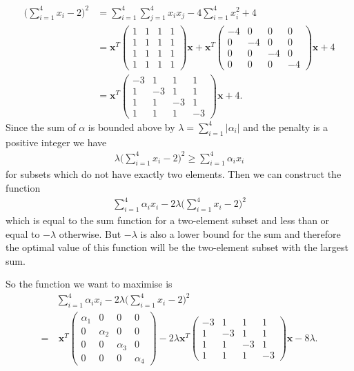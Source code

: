 \documentclass{article}
\begin{document}
\begin{align*}
	\bigg(\sum_{i=1}^4 x_i - 2\bigg)^2 &= \sum_{i=1}^4\sum_{j=1}^4 x_ix_j - 4\sum_{i=1}^4 x_i^2 + 4 \\
	&= \mathbf{x}^T \begin{pmatrix}
		1 & 1 & 1 & 1 \\
		1 & 1 & 1 & 1 \\
		1 & 1 & 1 & 1 \\
		1 & 1 & 1 & 1
	\end{pmatrix}\mathbf{x} +\mathbf{x}^T \begin{pmatrix}
		-4 & 0 & 0 & 0 \\
		0 & -4 & 0 & 0 \\
		0 & 0 & -4 & 0 \\
		0 & 0 & 0 & -4 
	\end{pmatrix}\mathbf{x} + 4 \\
	&= \mathbf{x}^T \begin{pmatrix}
		-3 & 1 & 1 & 1 \\
		1 & -3 & 1 & 1 \\
		1 & 1 & -3 & 1 \\
		1 & 1 & 1 & -3
	\end{pmatrix} \mathbf{x} + 4.
\end{align*}
Since the sum of \(\alpha\) is bounded above by \(\lambda = \sum_{i=1}^4 |\alpha_i|\) and the penalty is a positive integer we have
\begin{align*}
    \lambda \bigg(\sum_{i=1}^4 x_i - 2\bigg)^2 \geq \sum_{i=1}^4 \alpha_i x_i 
\end{align*}
for subsets which do not have exactly two elements. Then we can construct the function
\begin{align*}
    \sum_{i=1}^4 \alpha_i x_i - 2\lambda \bigg(\sum_{i=1}^4 x_i - 2\bigg)^2
\end{align*}
which is equal to the sum function for a two-element subset and less than or equal to \(-\lambda\) otherwise. But \(-\lambda\) is also a lower bound for the sum and therefore the optimal value of this function will be the two-element subset with the largest sum.

\noindent So the function we want to maximise is
\begin{align*}
    &\sum_{i=1}^4 \alpha_i x_i - 2\lambda \bigg(\sum_{i=1}^4 x_i - 2\bigg)^2 \\ =& \: \mathbf{x}^T\begin{pmatrix}
		\alpha_1 & 0 & 0 & 0 \\
		0 & \alpha_2 & 0 & 0 \\
		0 & 0 & \alpha_3 & 0 \\ 
		0 & 0 & 0 & \alpha_4
	\end{pmatrix} - 2 \lambda \mathbf{x}^T \begin{pmatrix}
	-3 & 1 & 1 & 1 \\
	1 & -3 & 1 & 1 \\
	1 & 1 & -3 & 1 \\
	1 & 1 & 1 & -3
	\end{pmatrix} \mathbf{x} - 8\lambda.
\end{align*}
\end{document}
